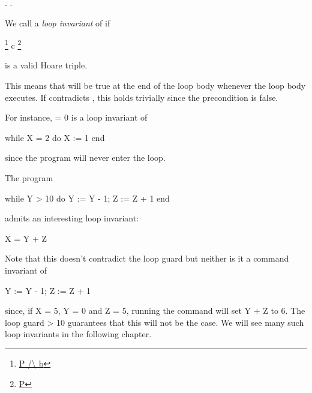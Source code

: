 \documentclass[12pt]{report}
\begin{document}
{{{{{{\begin{coqdoccode}
\coqdocindent{2.00em}
.\coqdoceol
\coqdocnoindent
{}.\coqdoceol
\coqdocemptyline
\end{coqdoccode}
We call  a \textit{loop invariant} of      if


      \footnote{\url{P /\ b}} c \footnote{\url{P}}


    is a valid Hoare triple.


    This means that  will be true at the end of the loop body
    whenever the loop body executes. If  contradicts , this
    holds trivially since the precondition is false.


    For instance,  = 0 is a loop invariant of


      while X = 2 do X := 1 end


    since the program will never enter the loop. 

 The program


    while Y > 10 do Y := Y - 1; Z := Z + 1 end


    admits an interesting loop invariant:


    X = Y + Z


    Note that this doesn't contradict the loop guard but neither
    is it a command invariant of


    Y := Y - 1; Z := Z + 1


    since, if X = 5,
    Y = 0 and Z = 5, running the command will set Y + Z to 6. The
    loop guard  > 10 guarantees that this will not be the case.
    We will see many such loop invariants in the following chapter.

}}}}}}
\end{document}
